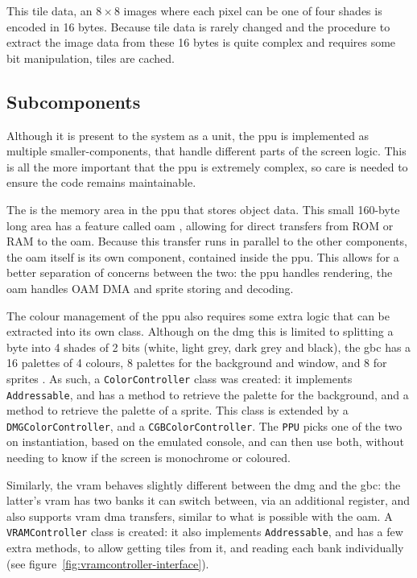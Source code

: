 \documentclass[11pt]{informatics-report}
\begin{document}
This tile data, an $8 \times 8$ images where each pixel can be one of four shades is encoded in 16 bytes. Because tile data is rarely changed and the procedure to extract the image data from these 16 bytes is quite complex and requires some bit manipulation, tiles are cached.


\subsection{Subcomponents}

Although it is present to the system as a unit, the \gls{ppu} is implemented as multiple smaller-components, that handle different parts of the screen logic. This is all the more important that the \gls{ppu} is extremely complex, so care is needed to ensure the code remains maintainable.

The  is the memory area in the \gls{ppu} that stores object data. This small 160-byte long area has a feature called \gls{oam} , allowing for direct transfers from ROM or RAM to the \gls{oam}. Because this transfer runs in parallel to the other components, the \gls{oam} itself is its own component, contained inside the \gls{ppu}. This allows for a better separation of concerns between the two: the \gls{ppu} handles rendering, the \gls{oam} handles OAM DMA and sprite storing and decoding.

The colour management of the \gls{ppu} also requires some extra logic that can be extracted into its own class. Although on the \gls{dmg} this is limited to splitting a byte into 4 shades of 2 bits (white, light grey, dark grey and black), the \gls{gbc} has a 16 palettes of 4 colours, 8 palettes for the background and window, and 8 for sprites \cite[Palettes]{pandoc}. As such, a \texttt{ColorController} class was created: it implements \texttt{Addressable}, and has a method to retrieve the palette for the background, and a method to retrieve the palette of a sprite. This class is extended by a \texttt{DMGColorController}, and a \texttt{CGBColorController}. The \texttt{PPU} picks one of the two on instantiation, based on the emulated console, and can then use both, without needing to know if the screen is monochrome or coloured.

Similarly, the \gls{vram} behaves slightly different between the \gls{dmg} and the \gls{gbc}: the latter's \gls{vram} has two banks it can switch between, via an additional register, and also supports \gls{vram} \gls{dma} transfers, similar to what is possible with the \gls{oam}. A \texttt{VRAMController} class is created: it also implements \texttt{Addressable}, and has a few extra methods, to allow getting tiles from it, and reading each bank individually (see figure~\ref{fig:vramcontroller-interface}).
\end{document}
